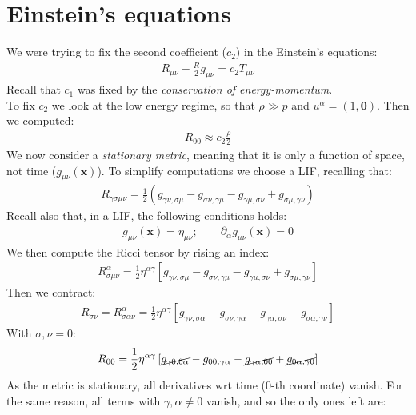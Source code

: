 \documentclass[../template.tex]{subfiles}
\begin{document}
\section{Einstein's equations}
We were trying to fix the second coefficient ($c_2$) in the Einstein's equations:
\begin{align*}
    R_{\mu \nu} - \frac{R}{2} g_{\mu \nu} = c_2 T_{\mu \nu} 
\end{align*}
Recall that $c_1$ was fixed by the \textit{conservation of energy-momentum}.\\
To fix $c_2$ we look at the low energy regime, so that $\rho \gg p$ and $u^\alpha = (1, \bm{0})$. Then we computed:
\begin{align*}
    R_00 \approx c_2 \frac{\rho}{2} 
\end{align*}     
We now consider a \textit{stationary metric}, meaning that it is only a function of space, not time ($g_{\mu \nu}(\bm{x})$). To simplify computations we choose a LIF, recalling that:
\begin{align*}
    R_{\gamma \sigma \mu \nu} = \frac{1}{2} \left(g_{\gamma \nu, \sigma \mu} - g_{\sigma \nu, \gamma \mu} - g_{\gamma \mu , \sigma \nu} + g_{\sigma \mu, \gamma \nu}\right) 
\end{align*}  
Recall also that, in a LIF, the following conditions holds:
\begin{align*}
    g_{\mu \nu}(\bm{x}) = \eta_{\mu \nu}; \qquad \partial_\alpha g_{\mu \nu}(\bm{x}) = 0
\end{align*}
We then compute the Ricci tensor by rising an index:
\begin{align*}
    R^\alpha_{\sigma \mu \nu} = \frac{1}{2} \eta^{\alpha \gamma} \left[g_{\gamma \nu, \sigma \mu} - g_{\sigma \nu, \gamma \mu} - g_{\gamma \mu, \sigma \nu} + g_{\sigma \mu, \gamma \nu}\right] 
\end{align*}
Then we contract:
\begin{align*}
    R_{\sigma \nu} = R^\alpha_{\sigma \alpha \nu} = \frac{1}{2} \eta^{\alpha \gamma} \left[g_{\gamma \nu, \sigma \alpha} - g_{\sigma \nu, \gamma \alpha}- g_{\gamma \alpha, \sigma \nu} + g_{\sigma \alpha, \gamma \nu}\right] 
\end{align*}
With $\sigma, \nu = 0$:
\begin{align*}
    R_{00} = \frac{1}{2} \eta^{\alpha \gamma}\left[\cancel{g_{\gamma 0, 0 \alpha}} - g_{00, \gamma \alpha} - \cancel{g_{\gamma \alpha,00} }+ \cancel{g_{0 \alpha, \gamma 0}}\right] 
\end{align*} 
As the metric is stationary, all derivatives wrt time ($0$-th coordinate) vanish. For the same reason, all terms with $\gamma, \alpha \neq 0$ vanish, and so the only ones left are:
\end{document}
